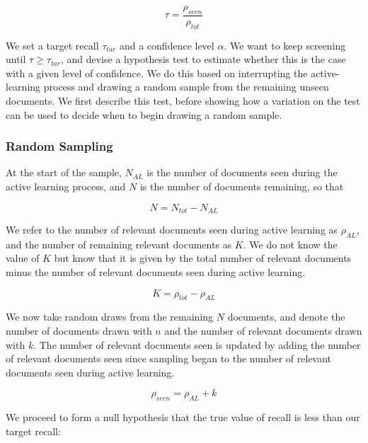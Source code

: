 \documentclass{bmcart}
\begin{document}
	\begin{equation}
	\tau = \frac{\rho_{seen}}{\rho_{tot}}
	\label{eq:recall-def}
	\end{equation}
	
	We set a target recall $\tau_{tar}$ and a confidence level $\alpha$. 
	We want to keep screening until $\tau \geq \tau_{tar}$, and devise a hypothesis test to estimate whether this is the case with a given level of confidence. 
	We do this	based on interrupting the active-learning process and drawing a random sample from the remaining unseen documents. 
	We first describe this test, before showing how a variation on the test can be used to decide when to begin drawing a random sample. 
	
	\subsubsection*{Random Sampling}
	
	At the start of the sample, $N_{AL}$ is the number of documents seen during the active learning process, and $N$ is the number of documents remaining, so that 
	
	\begin{equation}
	N = N_{tot} - N_{AL}
	\end{equation} 
	
	We refer to the number of relevant documents seen during active learning as $\rho_{AL}$, and the number of remaining relevant documents as $K$. We do not know the value of $K$ but know that it is given by the total number of relevant documents minus the number of relevant documents seen during active learning.
	
	\begin{equation}
	K = \rho_{tot} - \rho_{AL}
	\label{eq:K}
	\end{equation}
	
	We now take random draws from the remaining $N$ documents, and denote the number of documents drawn with $n$ and the number of relevant documents drawn with $k$. The number of relevant documents seen is updated by adding the number of relevant documents seen since sampling began to the number of relevant documents seen during active learning.
	
	\begin{equation}
	\rho_{seen} = \rho_{AL} + k
	\label{eq:rho_seen}
	\end{equation}
	
	We proceed to form a null hypothesis that the true value of recall is less than our target recall:
	
\end{document}
